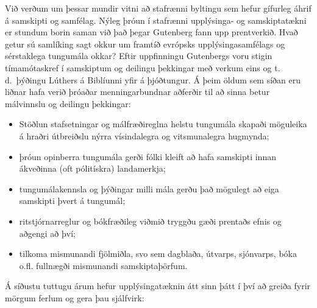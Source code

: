 \clearpage



\begin{multicols}{2}

Við verðum um þessar mundir vitni að stafrænni byltingu sem hefur gífurleg áhrif á samskipti og samfélag. Nýleg þróun í stafrænni upplýsinga- og samskiptatækni er stundum borin saman við það þegar Gutenberg fann upp prentverkið. Hvað getur sú samlíking sagt okkur um framtíð evrópsks upplýsingasamfélags og sérstaklega tungumála okkar?
Eftir uppfinningu Gutenbergs voru stigin tímamótaskref í samskiptum og deilingu þekkingar með verkum eins og t.\,d.~þýðingu Lúthers á Biblíunni yfir á þjóðtungur. Á þeim öldum sem síðan eru liðnar hafa verið þróaðar menningarbundnar aðferðir til að sinna betur málvinnslu og deilingu þekkingar:

\begin{itemize}
\item Stöðlun stafsetningar og málfræðireglna helstu tungumála skapaði möguleika á hraðri útbreiðslu nýrra vísindalegra og vitsmunalegra hugmynda;
\item þróun opinberra tungumála gerði fólki kleift að hafa samskipti innan ákveðinna (oft pólitískra) landamerkja;
\item tungumálakennsla og þýðingar milli mála gerðu það mögulegt að eiga samskipti þvert á tungumál;
\item ritstjórnarreglur og bókfræðileg viðmið tryggðu gæði prentaðs efnis og aðgengi að því;
\item tilkoma mismunandi fjölmiðla, svo sem dagblaða, útvarps, sjónvarps, bóka o.fl. fullnægði mismunandi samskiptaþörfum.
\end{itemize}

Á síðustu tuttugu árum hefur upplýsingatæknin átt sinn þátt í því að greiða fyrir mörgum ferlum og gera þau sjálfvirk:


\end{multicols}
